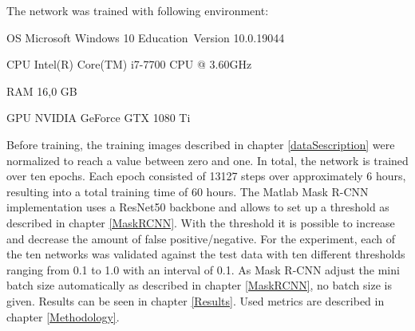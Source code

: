 The network was trained with following environment:

\begin{description}
    \item OS Microsoft Windows 10 Education~Version	10.0.19044
    \item CPU Intel(R) Core(TM) i7-7700 CPU @ 3.60GHz  
    \item RAM  16,0 GB
    \item GPU  NVIDIA GeForce GTX 1080 Ti                         
\end{description}

Before training, the training images described in chapter \ref{dataSescription} were normalized to reach a value between zero and one. In total, the network is trained over ten epochs. Each epoch consisted of 13127 steps over approximately 6 hours, resulting into a total training time of 60 hours. The Matlab Mask R-CNN implementation \cite{GitHub.25Aug22, .25Aug22} uses a ResNet50 \cite{K.He.2016}  backbone and allows to set up a threshold as described in chapter \ref{MaskRCNN}. With the threshold it is possible to increase and decrease the amount of false positive/negative. For the experiment, each of the ten networks was validated against the test data with ten different thresholds ranging from 0.1 to 1.0 with an interval of 0.1. As Mask R-CNN adjust the mini batch size automatically as described in chapter \ref{MaskRCNN}, no batch size is given.
Results can be seen in chapter \ref{Results}. Used metrics are described in chapter \ref{Methodology}.
 


